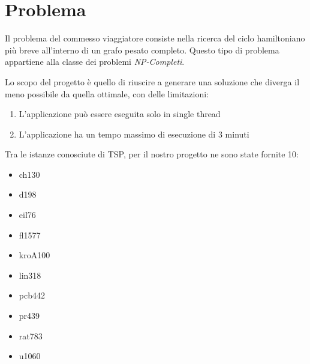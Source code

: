\chapter*{Problema}
\label{cha_problema}

Il problema del commesso viaggiatore consiste nella ricerca del ciclo hamiltoniano più breve all'interno di un grafo pesato completo. Questo tipo di problema appartiene alla classe dei problemi \emph{NP-Completi}.

Lo scopo del progetto è quello di riuscire a generare una soluzione che diverga il meno possibile da quella ottimale, con delle limitazioni:
\begin{enumerate}
	\item L'applicazione può essere eseguita solo in single thread
	\item L'applicazione ha un tempo massimo di esecuzione di 3 minuti
\end{enumerate}
Tra le istanze conosciute di TSP, per il nostro progetto ne sono state fornite 10:
\begin{itemize}
  \item ch130
  \item d198
  \item eil76
  \item fl1577
  \item kroA100
  \item lin318
  \item pcb442
  \item pr439
  \item rat783
  \item u1060
\end{itemize}

